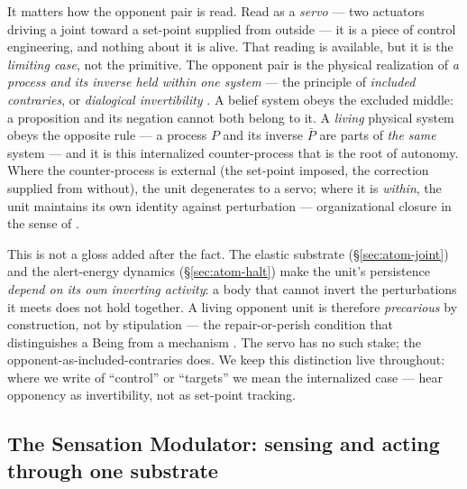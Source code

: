 \documentclass{article}
\begin{document}
It matters how the opponent pair is read.  Read as a \emph{servo} --- two
actuators driving a joint toward a set-point supplied from outside --- it is a
piece of control engineering, and nothing about it is alive.  That reading is
available, but it is the \emph{limiting case}, not the primitive.  The opponent
pair is the physical realization of \emph{a process and its inverse held within
one system} --- the principle of \emph{included contraries}, or \emph{dialogical
invertibility} \citep{GN2005_TowardsModelLifeCognition,Nagarjuna1994_Inversion}.
A belief system obeys the excluded middle: a proposition and its negation cannot
both belong to it.  A \emph{living} physical system obeys the opposite rule ---
a process $P$ and its inverse $\bar P$ are parts of \emph{the same} system ---
and it is this internalized counter-process that is the root of autonomy.  Where
the counter-process is external (the set-point imposed, the correction supplied
from without), the unit degenerates to a servo; where it is \emph{within}, the
unit maintains its own identity against perturbation --- organizational closure
in the sense of \citet{MaturanaVarela1980}.

This is not a gloss added after the fact.  The elastic substrate
(\S\ref{sec:atom-joint}) and the alert-energy dynamics (\S\ref{sec:atom-halt})
make the unit's persistence \emph{depend on its own inverting activity}: a body
that cannot invert the perturbations it meets does not hold together.  A living
opponent unit is therefore \emph{precarious} by construction, not by stipulation
--- the repair-or-perish condition that distinguishes a Being from a mechanism
\citep{GN2005_TowardsModelLifeCognition}.  The servo has no such stake; the
opponent-as-included-contraries does.  We keep this distinction live throughout:
where we write of ``control'' or ``targets'' we mean the internalized case ---
hear opponency as invertibility, not as set-point tracking.

\subsection{The Sensation Modulator: sensing and acting through one
substrate}\label{sec:atom-sm}
\end{document}
